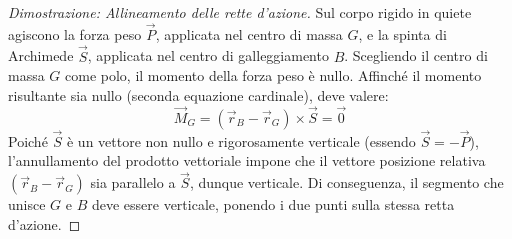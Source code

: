 \documentclass[11pt, a4paper, openright]{book}
\theoremstyle{plain}
\theoremstyle{definition}
\begin{document}
\begin{proof}[Dimostrazione: Allineamento delle rette d'azione]
Sul corpo rigido in quiete agiscono la forza peso $\vec{P}$, applicata nel centro di massa $G$, e la spinta di Archimede $\vec{S}$, applicata nel centro di galleggiamento $B$.
Scegliendo il centro di massa $G$ come polo, il momento della forza peso è nullo. Affinché il momento risultante sia nullo (seconda equazione cardinale), deve valere:
\begin{equation}
    \vec{M}_G = (\vec{r}_B - \vec{r}_G) \times \vec{S} = \vec{0} 
    \label{eq:momento_polo_G}
\end{equation}
Poiché $\vec{S}$ è un vettore non nullo e rigorosamente verticale (essendo $\vec{S} = -\vec{P}$), l'annullamento del prodotto vettoriale impone che il vettore posizione relativa $(\vec{r}_B - \vec{r}_G)$ sia parallelo a $\vec{S}$, dunque verticale. Di conseguenza, il segmento che unisce $G$ e $B$ deve essere verticale, ponendo i due punti sulla stessa retta d'azione.
\end{proof}
\end{document}
